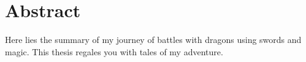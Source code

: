 

%




\chapter*{Abstract}

Here lies the summary of my journey of battles with dragons using swords and magic.
This thesis regales you with tales of my adventure. 


\cleardoublepage